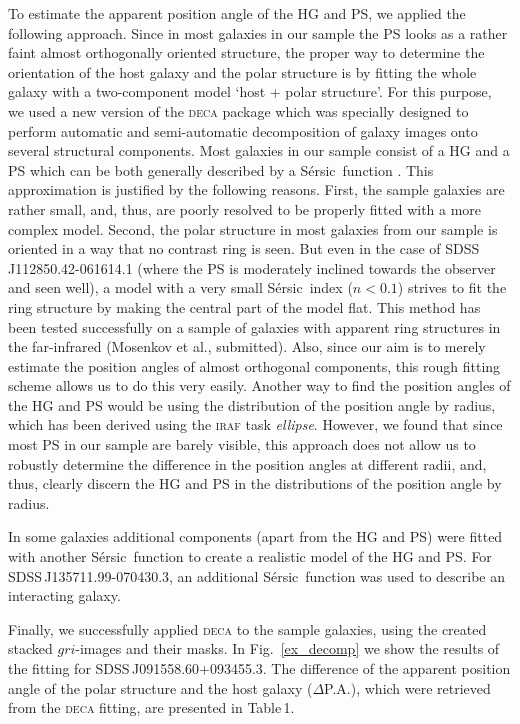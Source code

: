 \documentclass[a4paper,fleqn,usenatbib]{mnras}
\newcommand{\ser}{S\'ersic}
\begin{document}
To estimate the apparent position angle of the HG and PS, 
we applied the following approach. Since in most galaxies in our sample the 
PS looks as a rather faint almost orthogonally oriented structure, 
the proper way to determine the orientation of the host galaxy and the 
polar structure is by fitting the whole galaxy with a two-component model `host + polar structure'.
For this purpose, we used a new version of the \textsc{deca} 
package \citep{2014AstBu..69...99M} which was specially designed to perform 
automatic and semi-automatic decomposition of galaxy images onto several 
structural components. Most galaxies in our sample consist of a HG and a PS which can be both generally described 
by a \ser\ function \citep{ser1968}. This approximation is justified 
by the following reasons. First, the sample galaxies are rather small, 
and, thus, are poorly resolved to be properly fitted with a more complex 
model. Second, the polar structure in most galaxies from our 
sample is oriented in a way that no contrast ring is seen. But even in the case of SDSS\,J112850.42-061614.1 (where the PS is moderately inclined towards the observer and seen well), 
a model with a very small \ser\ index ($n<0.1$) strives to fit the ring 
structure by making the central part of the model flat. This method has been 
tested successfully on a sample of galaxies with apparent ring structures in 
the far-infrared (Mosenkov et al., submitted). Also, since 
our aim is to merely estimate the position angles of almost orthogonal 
components, this rough fitting scheme allows us to do this very easily. 
Another way to find the position angles of the HG and PS would be using 
the distribution of the position angle by radius, which has been derived 
using the \textsc{iraf} task \textit{ellipse}. However, we found that since 
most PS in our sample are barely visible, this approach does not allow us 
to robustly determine the difference in the position angles at different radii, 
and, thus, clearly discern the HG and PS in the distributions of the position 
angle by radius.

In some galaxies additional components (apart from the HG and PS) were fitted with 
another \ser\ function to create a realistic model of the HG and PS. 
For SDSS\,J135711.99-070430.3, 
an additional \ser\ function was used to describe an interacting galaxy. 

Finally, we successfully applied \textsc{deca} to the sample galaxies, 
using the created stacked $gri$-images and their masks. In Fig.~\ref{ex_decomp} 
we show the results of the fitting for SDSS\,J091558.60+093455.3. The difference of 
the apparent position angle of the polar structure and the host galaxy ($\Delta$P.A.), 
which were retrieved from the \textsc{deca} fitting, are presented in Table\,1. 
\end{document}
